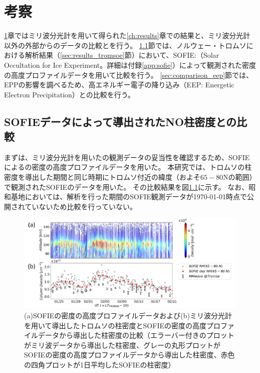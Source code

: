 \chapter{考察}
\label{ch:discussion}
\ref{ch:discussion}章ではミリ波分光計を用いて得られた\ref{ch:results}章での結果と、ミリ波分光計以外の外部からのデータの比較とを行う。
\ref{sec:comparison_sofie}節では、ノルウェー・トロムソにおける解析結果（\ref{sec:results_tromsoe}節）において、SOFIE:（Solar Occultation for Ice Experiment。詳細は付録\ref{app:sofie}）によって観測された密度の高度プロファイルデータを用いて比較を行う。
\ref{sec:comparison_eep}節では、EPPの影響を調べるため、高エネルギー電子の降り込み（EEP: Energetic Electron Precipitation）との比較を行う。


\section{SOFIEデータによって導出されたNO柱密度との比較}
\label{sec:comparison_sofie}
まずは、ミリ波分光計を用いたの観測データの妥当性を確認するため、SOFIEによるの密度の高度プロファイルデータを用いた。
本研究では、トロムソの柱密度を導出した期間と同じ時期にトロムソ付近の緯度（およそ$65 - 80$\textdegree Nの範囲）で観測されたSOFIEのデータを用いた。
その比較結果を図\ref{fig:sofie_mmcd}に示す。
なお、昭和基地においては、解析を行った期間のSOFIE観測データが\today 時点で公開されていないため比較を行っていない。
\begin{figure}[htbp]
    \centering
    \includegraphics[width=\linewidth]{master_thesis_contents/master_thesis_fig/sofie_mmcd.pdf}
    \caption{(a)SOFIEの密度の高度プロファイルデータおよび(b)ミリ波分光計を用いて導出したトロムソの柱密度とSOFIEの密度の高度プロファイルデータから導出した柱密度の比較（エラーバー付きのプロットがミリ波データから導出した柱密度、グレーの丸形プロットがSOFIEの密度の高度プロファイルデータから導出した柱密度、赤色の四角プロットが1日平均したSOFIEの柱密度）}
    \label{fig:sofie_mmcd}
\end{figure}
